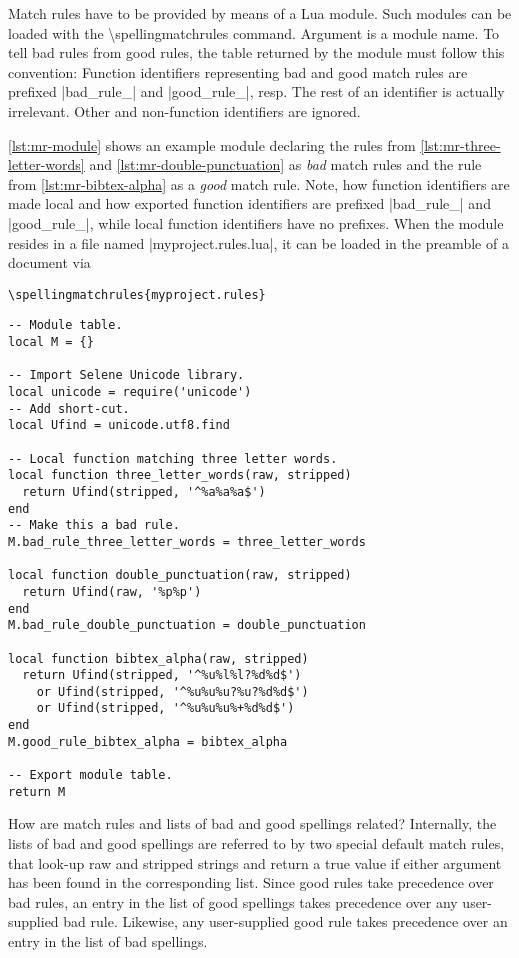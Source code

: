 \documentclass[11pt]{article}
\newcommand*{\cmd}[1]{\mbox{\ttfamily\textbackslash#1}}
\newcommand*{\macro}[1]{\cmd{#1}\marginpar{\cmd{#1}}}
\begin{document}
Match rules have to be provided by means of a Lua module.  Such modules
can be loaded with the \macro{spellingmatchrules} command.  Argument is
a module name.  To tell bad rules from good rules, the table returned by
the module must follow this convention: Function identifiers
representing bad and good match rules are prefixed |bad_rule_| and
|good_rule_|, resp.  The rest of an identifier is actually irrelevant.
Other and non-function identifiers are ignored.

\autoref{lst:mr-module} shows an example module declaring the rules from
\autoref{lst:mr-three-letter-words} and
\autoref{lst:mr-double-punctuation} as \emph{bad} match rules and the
rule from \autoref{lst:mr-bibtex-alpha} as a \emph{good} match rule.
Note, how function identifiers are made local and how exported function
identifiers are prefixed |bad_rule_| and |good_rule_|, while local
function identifiers have no prefixes.  When the module resides in a
file named |myproject.rules.lua|, it can be loaded in the preamble of a
document via
\begin{lstlisting}[language={[LaTeX]TeX}]
\spellingmatchrules{myproject.rules}
\end{lstlisting}

\begin{lstlisting}[style=Lua, float=p, label=lst:mr-module, caption={A Lua module containing two bad and one good match rule.}]
-- Module table.
local M = {}

-- Import Selene Unicode library.
local unicode = require('unicode')
-- Add short-cut.
local Ufind = unicode.utf8.find

-- Local function matching three letter words.
local function three_letter_words(raw, stripped)
  return Ufind(stripped, '^%a%a%a$')
end
-- Make this a bad rule.
M.bad_rule_three_letter_words = three_letter_words

local function double_punctuation(raw, stripped)
  return Ufind(raw, '%p%p')
end
M.bad_rule_double_punctuation = double_punctuation

local function bibtex_alpha(raw, stripped)
  return Ufind(stripped, '^%u%l%l?%d%d$')
    or Ufind(stripped, '^%u%u%u?%u?%d%d$')
    or Ufind(stripped, '^%u%u%u%+%d%d$')
end
M.good_rule_bibtex_alpha = bibtex_alpha

-- Export module table.
return M
\end{lstlisting}

How are match rules and lists of bad and good spellings related?
Internally, the lists of bad and good spellings are referred to by two
special default match rules, that look-up raw and stripped strings and
return a true value if either argument has been found in the
corresponding list.  Since good rules take precedence over bad rules, an
entry in the list of good spellings takes precedence over any
user-supplied bad rule.  Likewise, any user-supplied good rule takes
precedence over an entry in the list of bad spellings.
\end{document}
